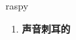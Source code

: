 
\begin{frame}
{\huge raspy}
\begin{center}
\begin{enumerate}\Large
  \item \textbf{声音刺耳的}
\end{enumerate}
\end{center}
\end{frame}
